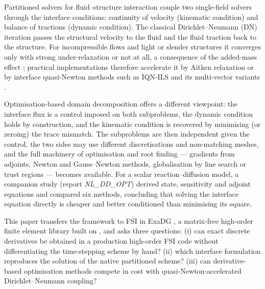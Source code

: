 \documentclass[11pt,a4paper]{article}
\theoremstyle{definition}
\theoremstyle{remark}
\begin{document}
Partitioned solvers for fluid--structure interaction couple two single-field solvers through the
interface conditions: continuity of velocity (kinematic condition) and balance of tractions
(dynamic condition). The classical Dirichlet--Neumann (DN) iteration passes the structural velocity
to the fluid and the fluid traction back to the structure. For incompressible flows and light or
slender structures it converges only with strong under-relaxation or not at all, a consequence of
the added-mass effect \cite{CausinGerbeauNobile2005}; practical implementations therefore
accelerate it by Aitken relaxation or by interface quasi-Newton methods such as IQN-ILS
\cite{Degroote2009} and its multi-vector variants \cite{Bogaers2014}.

Optimisation-based domain decomposition \cite{GunzburgerHeinkenschlossLee2000} offers a different
viewpoint: the interface flux is a control imposed on both subproblems, the dynamic condition
holds by construction, and the kinematic condition is recovered by minimising (or zeroing) the
trace mismatch. The subproblems are then independent given the control, the two sides may use
different discretisations and non-matching meshes, and the full machinery of optimisation and
root finding --- gradients from adjoints, Newton and Gauss--Newton methods, globalisation by line
search or trust regions --- becomes available. For a scalar reaction--diffusion model, a companion
study (report \emph{NL\_DD\_OPT}) derived state, sensitivity and adjoint equations and compared six
methods, concluding that solving the interface equation directly is cheaper and better conditioned
than minimising its square.

This paper transfers the framework to FSI in ExaDG \cite{ExaDG2020}, a matrix-free high-order
finite element library built on , and asks three questions: (i) can exact discrete
derivatives be obtained in a production high-order FSI code without differentiating the
time-stepping scheme by hand? (ii) which interface formulation reproduces the solution of the
native partitioned scheme? (iii) can derivative-based optimisation methods compete in cost with
quasi-Newton-accelerated Dirichlet--Neumann coupling?
\end{document}
